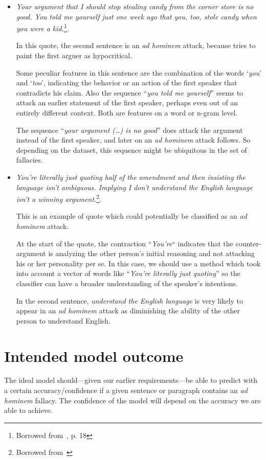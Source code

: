 \documentclass[a4paper]{article}
\begin{document}
\begin{itemize}
    \item \emph{Your argument that I should stop stealing candy from the corner store is no good. You told me yourself just one week ago that you, too, stole candy when you were a kid.}\footnote{Borrowed from~\cite{Walton1998}, p. 18}.
    
    In this quote, the second sentence is an \emph{ad hominem} attack, because tries to paint the first arguer as hypocritical. 

    Some peculiar features in this sentence are the combination of the words `\emph{you}' and `\emph{too}', indicating the behavior or an action of the first speaker  that contradicts his claim. Also the sequence ``\emph{you told me yourself}'' seems to attack an earlier statement of the first speaker, perhaps even out of an entirely different context. Both are features on a word or n-gram level.

    The sequence ``\emph{your argument (\dots) is no good}'' does attack the argument instead of the first speaker, and later on an \emph{ad hominem} attack follows. So depending on the dataset, this sequence might be ubiquitous in the set of fallacies.
    
    \item \emph{You're literally just quoting half of the amendment and then insisting the language isn't ambiguous. Implying I don't understand the English language isn't a winning argument.}\footnote{Borrowed from~\cite{Habernal.et.al.2018.NAACL.adhominem}}.
    
    This is an example of quote which could potentially be classified as an \emph{ad hominem} attack.
    
    At the start of the quote, the contraction ``\emph{You're}`` indicates that the counter-argument is analyzing the other person's initial reasoning and not attacking his or her personality per se. In this case, we should use a method which took into account a vector of words like ``\emph{You're literally just quoting}'' so the classifier can have a broader understanding of the speaker's intentions.
    
    In the second sentence, \emph{understand the English language} is very likely to appear in an \emph{ad hominem} attack as diminishing the ability of the other person to understand English. 
    
\end{itemize}

\section{Intended model outcome}
The ideal model should---given our earlier requirements---be able to predict with a certain accuracy/confidence if a given sentence or paragraph contains an \emph{ad hominem} fallacy. The confidence of the model will depend on the accuracy we are able to achieve. 
\end{document}
